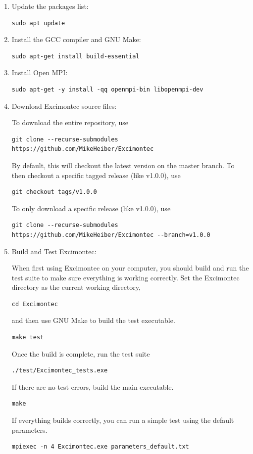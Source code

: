 \documentclass[%
 reprint,onecolumn,notitlepage,
superscriptaddress,longbibliography,
 amsmath,amssymb,
 aps,rmp,floatfix,
]{revtex4-1}
\begin{document}
\begin{enumerate}

\item Update the packages list:
\begin{verbatim}
sudo apt update
\end{verbatim}

\item Install the GCC compiler and GNU Make:
\begin{verbatim}
sudo apt-get install build-essential
\end{verbatim}

\item Install Open MPI:
\begin{verbatim}
sudo apt-get -y install -qq openmpi-bin libopenmpi-dev
\end{verbatim}

\item Download Excimontec source files:
    
To download the entire repository, use
\begin{verbatim}
git clone --recurse-submodules https://github.com/MikeHeiber/Excimontec
\end{verbatim}
By default, this will checkout the latest version on the master branch. 
To then checkout a specific tagged release (like v1.0.0), use
\begin{verbatim}
git checkout tags/v1.0.0
\end{verbatim}
To only download a specific release (like v1.0.0), use 
\begin{verbatim}
git clone --recurse-submodules https://github.com/MikeHeiber/Excimontec --branch=v1.0.0
\end{verbatim}

\item Build and Test Excimontec:

When first using Excimontec on your computer, you should build and run the test suite to make sure everything is working correctly.    
Set the Excimontec directory as the current working directory,
\begin{verbatim}
cd Excimontec
\end{verbatim}
and then use GNU Make to build the test executable.
\begin{verbatim}
make test
\end{verbatim}
Once the build is complete, run the test suite
\begin{verbatim}
./test/Excimontec_tests.exe
\end{verbatim}
If there are no test errors, build the main executable.
\begin{verbatim}
make
\end{verbatim}
If everything builds correctly, you can run a simple test using the default parameters.
\begin{verbatim}
mpiexec -n 4 Excimontec.exe parameters_default.txt
\end{verbatim}


\end{enumerate}
\end{document}
